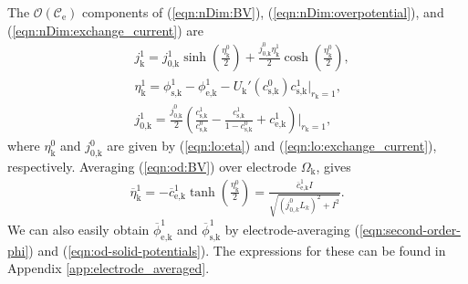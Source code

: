 \documentclass[a4paper]{article}
\newcommand{\ts}[1]{_{\text{#1}}}
\newcommand{\mybar}{\overline}
\begin{document}
The $\mathcal{O}(\mathcal{C}\ts{e})$ components of (\ref{eqn:nDim:BV}), (\ref{eqn:nDim:overpotential}), and (\ref{eqn:nDim:exchange_current}) are 
\begin{subequations}\label{eqn:od:all_BV}
    \begin{align} \label{eqn:od:BV}
    	&j\ts{k}^1 = j\ts{$0$,k}^1 \sinh\left( \frac{\eta\ts{k}^0}{2}  \right) + \frac{j\ts{$0$,k}^0  \eta\ts{k}^1}{2}\cosh(\frac{\eta\ts{k}^0}{2}), \\
    	&\eta\ts{k}^1 = \phi^1\ts{s,k} - \phi^1\ts{e,k}  - U\ts{k}'(c^0\ts{s,k})c\ts{s,k}^1\big|_{r\ts{k}=1},\\
        & j\ts{$0$,k}^1 = \frac{j\ts{$0$,k}^0}{2}\left(\frac{c\ts{s,k}^1}{c\ts{s,k}^0} - \frac{c\ts{s,k}^1}{1-c\ts{s,k}^0} + c\ts{e,k}^1 \right)\bigg|_{r\ts{k}=1},
        \end{align} 
\end{subequations}
where $\eta\ts{k}^0$ and $j\ts{$0$,k}^0$ are given by (\ref{eqn:lo:eta}) and (\ref{eqn:lo:exchange_current}), respectively. Averaging (\ref{eqn:od:BV}) over electrode $\Omega\ts{k}$, gives
\begin{equation}\label{eqn:eta-bar-1}
  \begin{aligned}
    \mybar{\eta}\ts{k}^1 = -\mybar{c}\ts{e,k}^1 \tanh\left(\frac{\eta\ts{k}^0}{2}\right)= \frac{\mybar{c}\ts{e,k}^1I}{\sqrt{(j_{0,k}^0L_k)^2 + I^2}}.
  \end{aligned}
\end{equation}
We can also easily obtain $\mybar{\phi}\ts{e,k}^1$ and $\mybar{\phi}\ts{s,k}^1$ by electrode-averaging (\ref{eqn:second-order-phi}) and (\ref{eqn:od-solid-potentials}). The expressions for these can be found in Appendix \ref{app:electrode_averaged}. 
\end{document}
